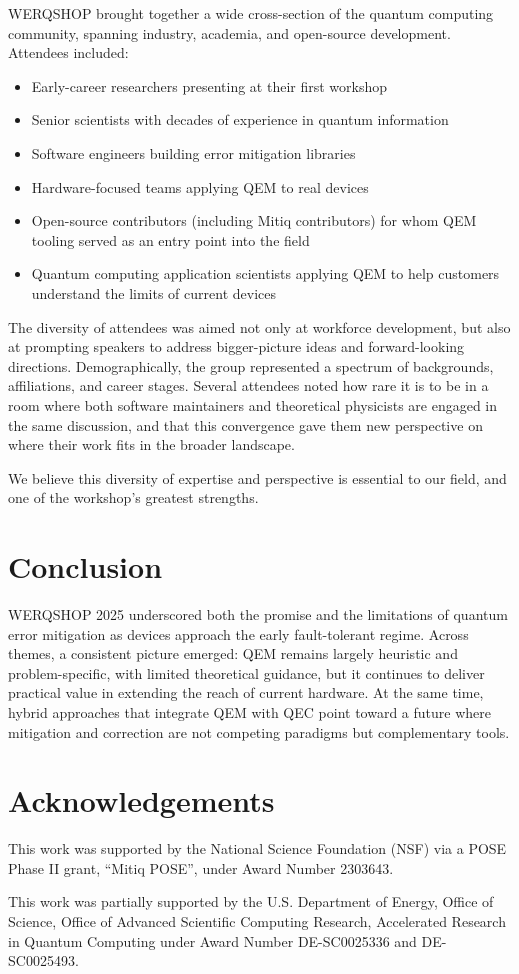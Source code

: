 \documentclass{article}
\begin{document}
WERQSHOP brought together a wide cross-section of the quantum computing community, spanning industry, academia, and open-source development. 
Attendees included:

\begin{itemize}
  \item Early-career researchers presenting at their first workshop
  \item Senior scientists with decades of experience in quantum information
  \item Software engineers building error mitigation libraries
  \item Hardware-focused teams applying QEM to real devices
  \item Open-source contributors (including Mitiq contributors) for whom QEM tooling served as an entry point into the field
  \item Quantum computing application scientists applying QEM to help customers understand the limits of current devices
\end{itemize}

The diversity of attendees was aimed not only at workforce development, but also at prompting speakers to address bigger-picture ideas and forward-looking directions.
Demographically, the group represented a spectrum of backgrounds, affiliations, and career stages.
Several attendees noted how rare it is to be in a room where both software maintainers and theoretical physicists are engaged in the same discussion, and that this convergence gave them new perspective on where their work fits in the broader landscape.

We believe this diversity of expertise and perspective is essential to our field, and one of the workshop's greatest strengths.

\section{Conclusion}

WERQSHOP 2025 underscored both the promise and the limitations of quantum error mitigation as devices approach the early fault-tolerant regime.
Across themes, a consistent picture emerged: QEM remains largely heuristic and problem-specific, with limited theoretical guidance, but it continues to deliver practical value in extending the reach of current hardware.
At the same time, hybrid approaches that integrate QEM with QEC point toward a future where mitigation and correction are not competing paradigms but complementary tools.

\section{Acknowledgements}
This work was supported by the National Science Foundation (NSF) via a POSE Phase II grant, “Mitiq POSE”, under Award Number 2303643.

This work was partially supported by the U.S. Department of Energy, Office of Science, Office of Advanced Scientific Computing Research, Accelerated Research in Quantum Computing under Award Number DE-SC0025336 and DE-SC0025493.

  

\end{document}
